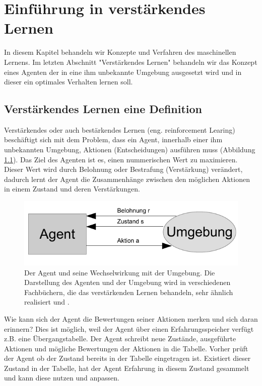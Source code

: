 \chapter{Einführung in verstärkendes Lernen}
\label{cha:Einführung in verstärkendes Lernen}

In diesem Kapitel behandeln wir Konzepte und Verfahren des maschinellen Lernens. Im letzten Abschnitt "Verstärkendes Lernen" behandeln wir das Konzept eines Agenten der in eine ihm unbekannte Umgebung ausgesetzt wird und in dieser ein optimales Verhalten lernen soll.

\section{Verstärkendes Lernen eine Definition}
\label{sec:Verstärkendes Lernen eine Definition}
Verstärkendes oder auch bestärkendes Lernen (eng. reinforcement Learing) beschäftigt sich mit dem Problem, dass ein Agent, innerhalb einer ihm unbekannten Umgebung, Aktionen (Entscheidungen) ausführen muss (Abbildung \ref{fig:agent_umgebung}). Das Ziel des Agenten ist es, einen nummerischen Wert zu maximieren. Dieser Wert wird durch Belohnung oder Bestrafung (Verstärkung) verändert, dadurch lernt der Agent die Zusammenhänge zwischen den möglichen Aktionen in einem Zustand und deren Verstärkungen. \\

\begin{figure}[!htbp]
  \centering
  \includegraphics[scale = 1.4]{inhalt/abbildungen/agent_umgebung.pdf}
  \caption{Der Agent und seine Wechselwirkung mit der Umgebung. Die Darstellung des Agenten und der Umgebung wird in verschiedenen Fachbüchern, die das  verstärkenden Lernen behandeln, sehr ähnlich realisiert \cite[398]{Alpaydin} und \cite[290]{Ertel}.}
  \label{fig:agent_umgebung}
\end{figure} 

Wie kann sich der Agent die Bewertungen seiner Aktionen merken und sich daran erinnern? Dies ist möglich, weil der Agent über einen Erfahrungsspeicher verfügt z.B. eine Übergangstabelle. Der Agent schreibt neue Zustände, ausgeführte Aktionen und mögliche Bewertungen der Aktionen in die Tabelle. Vorher prüft der Agent ob der Zustand bereits in der Tabelle eingetragen ist. Existiert dieser Zustand in der Tabelle, hat der Agent Erfahrung in diesem Zustand gesammelt und kann diese nutzen und anpassen. \\
 
